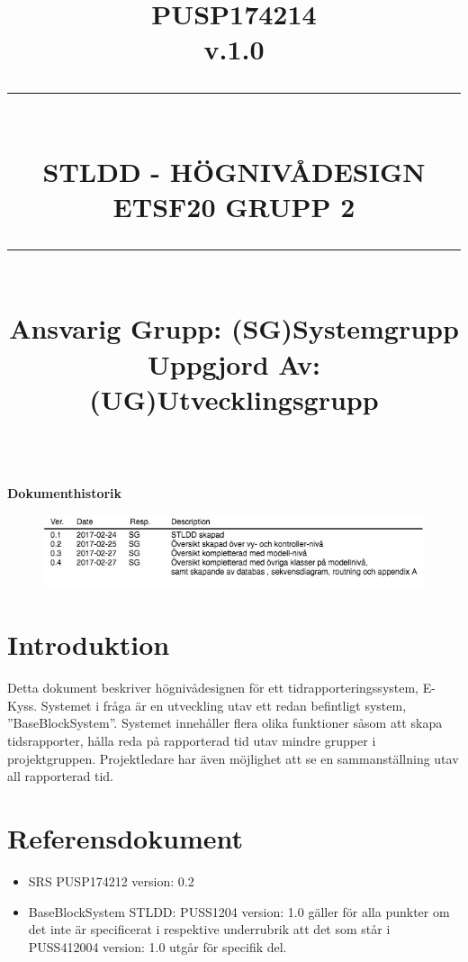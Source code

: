 \documentclass[paper=a4, fontsize=11pt,twoside]{article}
\title{
		\documentNumber{#1}																		
		\documentVersion{#2}																			
		\HRule{0.5pt} \\ %
		\LARGE \textbf{\uppercase{#3}} \\
		\large \textbf{\uppercase{ETSF20 Grupp 2}} 
		\HRule{2pt} \\ [1.5cm]    
		\normalsize            
		\documentResponsible{#4} \\ 
		\documentCreator{#5}  
	}
\newcommand{\HRule}[1]{\rule{\linewidth}{#1}}
\newcommand{\documentNumber}[1]{\centering PUSP1742#1 \\[1.0cm]}
\newcommand{\documentVersion}[1]{\centering \small{v.#1} \\[1.0cm]}
\newcommand{\documentResponsible}[1]{\centering  Ansvarig Grupp: #1}
\newcommand{\documentCreator}[1]{\centering Uppgjord Av: #1}
\newcommand{\grouptitlepage}[5]{ 
	\title{
		\documentNumber{#1}																		
		\documentVersion{#2}																			
		\HRule{0.5pt} \\ %
		\LARGE \textbf{\uppercase{#3}} \\
		\large \textbf{\uppercase{ETSF20 Grupp 2}} 
		\HRule{2pt} \\ [1.5cm]    
		\normalsize            
		\documentResponsible{#4} \\ 
		\documentCreator{#5}  
	}																							
	\maketitle																					
	\thispagestyle{empty} 																		
	\newpage 
}
\begin{document}
\grouptitlepage
{14}
{1.0}
{STLDD - Högnivådesign}
{(SG)Systemgrupp}
{(UG)Utvecklingsgrupp}
\tableofcontents
\mbox{}\\
{\Large \textbf{Dokumenthistorik}}
\begin{figure}[H]

\includegraphics[width=13cm]{DokumentHistorik}
\end{figure}
\section{Introduktion}
Detta dokument beskriver högnivådesignen för ett tidrapporteringssystem, E-Kyss. Systemet i fråga är en utveckling utav ett redan befintligt system, ''BaseBlockSystem''. Systemet innehåller flera olika funktioner såsom att skapa tidsrapporter, hålla reda på rapporterad tid utav mindre grupper i projektgruppen. Projektledare har även möjlighet att se en sammanställning utav all rapporterad tid. 

\section{Referensdokument}
\begin{itemize}
\item SRS PUSP174212 version: 0.2
\item BaseBlockSystem STLDD: PUSS1204 version: 1.0 gäller för alla punkter om det inte är specificerat i respektive underrubrik att det som står i PUSS412004 version: 1.0 utgår för specifik del.
\end{itemize}
\end{document}
